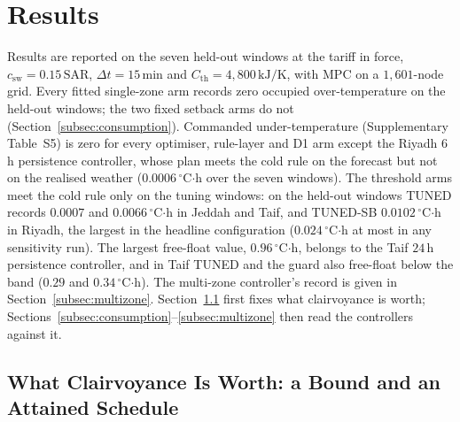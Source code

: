 \documentclass[3p,twocolumn,number]{elsarticle}
\newcommand{\Cth}{C_{\mathrm{th}}}
\newcommand{\csw}{c_{\mathrm{sw}}}
\newcommand{\SAR}{\text{SAR}}
\begin{document}
\section{Results}
\label{sec:results}

Results are reported on the seven held-out windows at the tariff in force, $\csw=0.15\,\SAR$, $\Delta t=15\,$min and $\Cth=4{,}800\,\text{kJ/K}$, with MPC on a $1{,}601$-node grid. Every fitted single-zone arm records zero occupied over-temperature on the held-out windows; the two fixed setback arms do not (Section~\ref{subsec:consumption}). Commanded under-temperature (Supplementary Table~S5) is zero for every optimiser, rule-layer and D1 arm except the Riyadh $6\,$h persistence controller, whose plan meets the cold rule on the forecast but not on the realised weather ($0.0006\,^\circ$C$\cdot$h over the seven windows). The threshold arms meet the cold rule only on the tuning windows: on the held-out windows TUNED records $0.0007$ and $0.0066\,^\circ$C$\cdot$h in Jeddah and Taif, and TUNED-SB $0.0102\,^\circ$C$\cdot$h in Riyadh, the largest in the headline configuration ($0.024\,^\circ$C$\cdot$h at most in any sensitivity run). The largest free-float value, $0.96\,^\circ$C$\cdot$h, belongs to the Taif $24\,$h persistence controller, and in Taif TUNED and the guard also free-float below the band ($0.29$ and $0.34\,^\circ$C$\cdot$h). The multi-zone controller's record is given in Section~\ref{subsec:multizone}. Section~\ref{subsec:bound} first fixes what clairvoyance is worth; Sections~\ref{subsec:consumption}--\ref{subsec:multizone} then read the controllers against it.
 
\subsection{What Clairvoyance Is Worth: a Bound and an Attained Schedule}
\label{subsec:bound}
\end{document}
